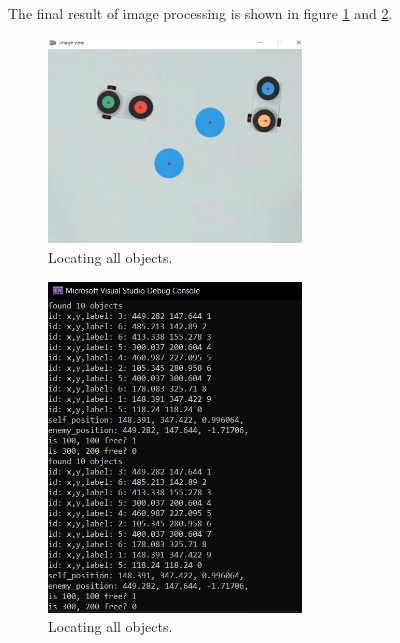 The final result of image processing is shown in figure \ref{IP_result} and \ref{IP_result2}.

    \begin{figure}[thb]
        \centering
        \includegraphics[width=0.6\textwidth]{images/IP_result.png}
        \caption[Locating all objects]{Locating all objects.}\label{IP_result}
    \end{figure}

    \begin{figure}[thb]
        \centering
        \includegraphics[width=0.6\textwidth]{images/IP_result2.jpeg}
        \caption[Locating all objects]{Locating all objects.}\label{IP_result2}
    \end{figure}
